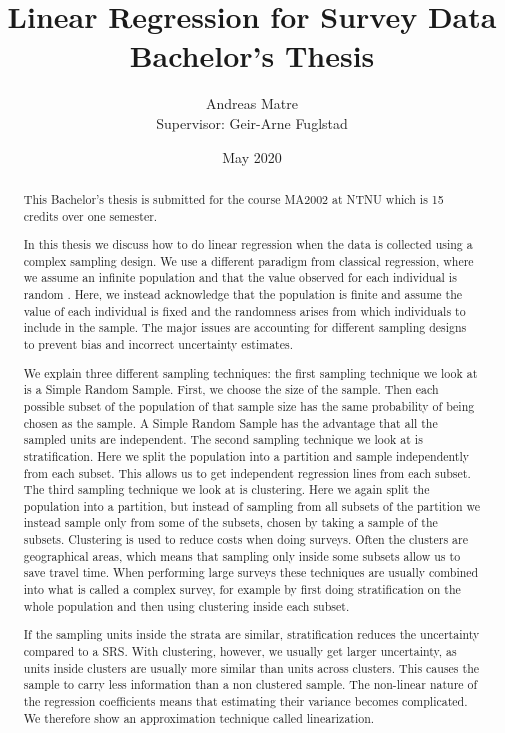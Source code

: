 \documentclass{article}
\title{\textbf{Linear Regression for Survey Data} \\
{\Large Bachelor's Thesis}}
\author{Andreas Matre \\
Supervisor: Geir-Arne Fuglstad}
\date{May 2020}
\begin{document}
\newtheorem{definition}{Definition}
\newtheorem{theorem}{Theorem}
\newtheorem{example}{Example}


\maketitle

\begin{abstract}
  This Bachelor's thesis is submitted for the course MA2002 at NTNU which is 15
  credits over one semester.

  In this thesis we discuss how to do linear regression when the data is
  collected using a complex sampling design. We use a different paradigm from
  classical regression, where we assume an infinite population and that the
  value observed for each individual is random . Here, we instead acknowledge
  that the population is finite and assume the value of each individual is fixed
  and the randomness arises from which individuals to include in the sample. The
  major issues are accounting for different sampling designs to prevent bias and
  incorrect uncertainty estimates.

  We explain three different sampling techniques: the first sampling technique we look at is a Simple Random Sample. First, we
  choose the size of the sample. Then each possible subset of
  the population of that sample size has the same probability of being chosen as
  the sample. A Simple Random Sample has the advantage that all the sampled
  units are independent.
  The second sampling technique we look at is stratification. Here we split the
  population into a partition and sample independently from each subset. This
  allows us to get independent regression lines from each subset. The third
  sampling technique we look at is clustering. Here we again split
  the population into a partition, but instead of sampling from all subsets of
  the partition we instead sample only from some of the subsets, chosen by
  taking a sample of the subsets. Clustering is used
  to reduce costs when doing surveys. Often the clusters are geographical areas,
  which means that sampling only inside some subsets allow us to save 
  travel time. When performing large surveys these techniques are usually combined into what
  is called a complex survey, for example by first doing stratification on the
  whole population and then using clustering inside each subset.

  If the sampling units inside the strata are similar, stratification reduces
  the uncertainty compared to a SRS. With clustering, however, we usually get
  larger uncertainty, as units inside clusters are usually more similar than
  units across clusters. This causes the sample to carry less information than a
  non clustered sample. The non-linear
  nature of the regression coefficients means that estimating their variance
  becomes complicated. We therefore show an approximation technique called linearization.
\end{abstract}
\end{document}
